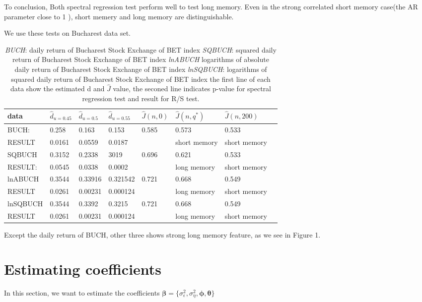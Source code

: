 \documentclass[10pt,a4paper]{article}
\begin{document}
To conclusion, Both spectral regression test perform well to test long memory. Even in the strong correlated short memory case(the AR parameter close to 1 ), short memery and long memory are distinguishable.

We use these tests on Bucharest data set. 

\begin{table}[!hbp]
\begin{tabular}{llllllll}
\hline
\hline
data & $\hat{d}_{u=0.45}$ & $\hat{d}_{u=0.5}$ & $\hat{d}_{u=0.55}$ & $\hat{J}(n,0) $& $\hat{J}(n,q^*) $&$\hat{J}(n,200)$ \\
\hline
BUCH: & 0.258 & 0.163 &  0.153 & 0.585 &     0.573 & 0.533 \\
RESULT& 0.0161 & 0.0559  & 0.0187 & \, &   short memory &  short memory\\
\hline
SQBUCH  & 0.3152 & 0.2338   & 3019 & 0.696  &   0.621 & 0.533\\
RESULT: & 0.0545 &0.0338  & 0.0002  & \, &   long memory & short memory \\
\hline
lnABUCH& 0.3544 & 0.33916  & 0.321542 & 0.721 &   0.668 & 0.549\\
RESULT & 0.0261 &  0.00231  & 0.000124 & \,  &  long memory & short memory\\
\hline
lnSQBUCH &0.3544 & 0.3392 &  0.3215 & 0.721 &     0.668 & 0.549 \\
RESULT& 0.0261  & 0.00231  & 0.000124  & \,  &   long memory &  short memory\\
\hline
\end{tabular}
\caption{\emph{BUCH}: daily return of Bucharest Stock Exchange of BET index\qquad
\emph{SQBUCH}: squared daily return of Bucharest Stock Exchange of BET index \qquad \emph{lnABUCH} logarithms of absolute daily return of Bucharest Stock Exchange of BET index \qquad \emph{lnSQBUCH}: logarithms of squared daily return of Bucharest Stock Exchange of BET index \qquad\qquad the first line of each data show the estimated d and $\hat{J}$ value, the seconed line indicates p-value for spectral regression test and result for R/S test.
}

\end{table}
Except the daily return of BUCH, other three shows strong long memory feature, as we see in Figure 1.
 
\section{Estimating coefficients}
In this section, we want to estimate the coefficients $\bm{\beta}=\{\sigma_\epsilon^2,\sigma_\eta^2,\bm{\phi,\bm{\theta}}\}$
\end{document}
